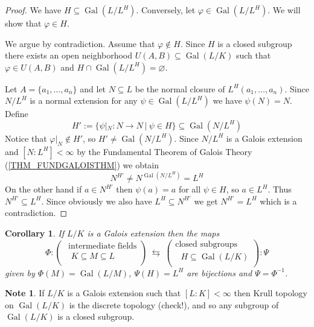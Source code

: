 \documentclass[12pt, letterpaper, oneside]{article}
\theoremstyle{plain}
\newtheorem{corollary}[theorem]{Corollary}
\theoremstyle{definition}
\newtheorem{note}[theorem]{Note}
\newcommand{\Gal}{\operatorname{Gal}}
\newcommand{\vs}{\vskip 5mm}
\begin{document}
\vs

\begin{proof}
We have $H\subseteq \Gal(L/L^{H})$. Conversely, let $\varphi\in \Gal(L/L^{H})$. We will show 
that $\varphi\in H$. 

We argue by contradiction. Assume that $\varphi\not\in H$. Since $H$ is a closed subgroup
there exists an open neighborhood $U(A, B)\subseteq \Gal(L/K)$ such that $\varphi\in U(A, B)$
and $H \cap \Gal(L/L^{H}) = \varnothing$.  

Let $A= \{ a_{1}, \dots, a_{n}\}$ and let $N\subseteq L$
be the normal closure of $L^{H}(a_{1}, \dots, a_{n})$. Since $N/L^{H}$ is a normal extension 
for any $\psi \in \Gal(L/L^{H})$ we have $\psi(N) = N$. Define 
$$H' := \{ \psi|_{N}\colon N\to N \ | \ \psi\in H \} \subseteq \Gal(N/L^{H})$$
Notice that $\varphi|_{N}\not\in H'$, so $H'\neq \Gal(N/L^{H})$. 
Since $N/L^{H}$ is a Galois extension and $[N:L^{H}] <\infty$ by the Fundamental Theorem of 
Galois Theory (\ref{THM_FUNDGALOISTHM})  we obtain 
$$N^{H'} \neq N^{\Gal(N/L^{H})} = L^{H}$$
On the other hand if $a\in N^{H'}$ then $\psi(a) = a$ for all $\psi\in H$, so $a\in L^{H}$. Thus 
$N^{H'} \subseteq L^{H}$. Since obviously we also have $L^{H}\subseteq N^{H'}$ we get 
$N^{H'} = L^{H}$ which is a contradiction. 

\end{proof}


\vs\vs

\begin{corollary}
If $L/K$ is a Galois extension then the maps 
$$
\Phi\colon 
\begin{pmatrix}
\text{ intermediate fields} \\[1mm]
\text{  $K\subseteq M \subseteq L$} \\
\end{pmatrix}
\ \leftrightarrows \ 
\begin{pmatrix}
\text{closed subgroups} \\[1mm]
\text{ $H\subseteq \Gal(L/K)$} \\
\end{pmatrix}
\colon \Psi
$$
given by $\Phi(M) = \Gal(L/M)$,  $\Psi(H) = L^{H}$
are bijections and $\Psi = \Phi^{-1}$. 
\end{corollary}


\vs\vs

\begin{note}
If $L/K$ is a Galois extension such that $[L:K]<\infty$ then  Krull topology on $\Gal(L/K)$
is the discrete topology (check!), and so any subgroup of $\Gal(L/K)$ is a closed subgroup. 
\end{note}
\end{document}
